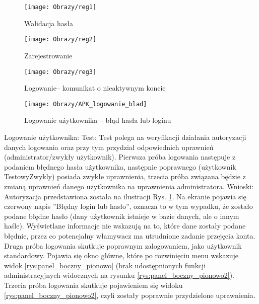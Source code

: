 \begin{enumerate*}
		\begin{figure}[ht!]
		\centering
		\begin{minipage}{0.3\textwidth}
			\texttt{[image: Obrazy/reg1]}
			\caption{Walidacja hasła }
			\label{rys:reg1}
		\end{minipage}
	\hspace{0.05\textwidth}
		\begin{minipage}{0.3\textwidth}
			\texttt{[image: Obrazy/reg2]}
			\caption{Zarejestrowanie}
			\label{rys:reg2}
		\end{minipage}
		\hspace{0.05\textwidth}
		\begin{minipage}{0.3\textwidth}
			\texttt{[image: Obrazy/reg3]}
			\caption{Logowanie-- komunikat o nieaktywnym koncie}
			\label{rys:reg3}
		\end{minipage}
	\hspace{0.05\textwidth}
\begin{minipage}{0.3\textwidth}
	\texttt{[image: Obrazy/APK\_logowanie\_blad]}
	\caption{Logowanie użytkownika -- błąd hasła lub loginu}
	\label{rys:Logodwanie_blad_hasla}
\end{minipage}
	\end{figure}
\newpage
	\item Logowanie użytkownika: \newline
	Test: Test polega na weryfikacji działania autoryzacji danych logowania oraz przy tym przydział odpowiednich uprawnień (administrator/zwykły użytkownik). Pierwsza próba logowania następuje z podaniem błędnego hasła użytkownika, następnie poprawnego (użytkownik TestowyZwykly) posiada zwykłe uprawnienia, trzecia próba związana będzie z zmianą uprawnień danego użytkownika na uprawnienia administratora.\newline
	Wnioski: Autoryzacja przedstawiona została na ilustracji Rys. \ref{rys:Logodwanie_blad_hasla}. Na ekranie pojawia się czerwony napis ''Błędny login lub hasło'', oznacza to w tym wypadku, że zostało podane błędne hasło (dany użytkownik istnieje w bazie danych, ale o innym haśle). Wyświetlane informacje nie wskazują na to, które dane zostały podane błędnie, przez co potencjalny włamywacz ma utrudnione zadanie przejęcia konta. Druga próba logowania skutkuje poprawnym zalogowaniem, jako użytkownik standardowy. Pojawia się okno główne, które po rozwinięciu menu wskazuje widok \ref{rys:panel_boczny_pionowo} (brak udostępnionych funkcji administracyjnych widocznych na rysunku \ref{rys:panel_boczny_pionowo2}). Trzecia próba logowania skutkuje pojawieniem się widoku \ref{rys:panel_boczny_pionowo2}, czyli zostały poprawnie przydzielone uprawnienia.
	

\end{enumerate*}
